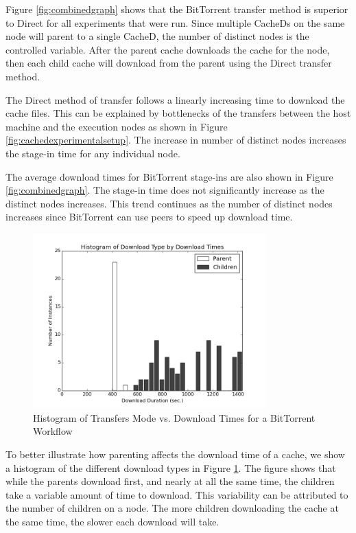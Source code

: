 Figure \ref{fig:combinedgraph} shows that the BitTorrent transfer method is superior to Direct for all experiments that were run.  Since multiple CacheDs on the same node will parent to a single CacheD, the number of distinct nodes is the controlled variable.  After the parent cache downloads the cache for the node, then each child cache will download from the parent using the Direct transfer method.

The Direct method of transfer follows a linearly increasing time to download the cache files.  This can be explained by bottlenecks of the transfers between the host machine and the execution nodes as shown in Figure \ref{fig:cachedexperimentalsetup}.  The increase in number of distinct nodes increases the stage-in time for any individual node.

The average download times for BitTorrent stage-ins are also shown in Figure \ref{fig:combinedgraph}.  The stage-in time does not significantly increase as the distinct nodes increases.  This trend continues as the number of distinct nodes increases since BitTorrent can use peers to speed up download time.

\begin{figure}[h!t]
\centering
\includegraphics[width=0.8\textwidth]{images/modes_vs_downloadtimes-grayscale.png}
\caption{Histogram of Transfers Mode vs. Download Times for a BitTorrent Workflow}
\label{fig:histmethod}
\end{figure}

To better illustrate how parenting affects the download time of a cache, we show a histogram of the different download types in Figure \ref{fig:histmethod}.  The figure shows that while the parents download first, and nearly at all the same time, the children take a variable amount of time to download.  This variability can be attributed to the number of children on a node.  The more children downloading the cache at the same time, the slower each download will take. 

